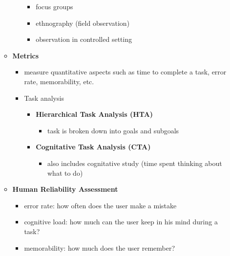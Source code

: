 \documentclass[11pt]{article}
\begin{document}
\begin{itemize}
\begin{itemize}
\begin{itemize}
\begin{itemize}
\item focus groups
\item ethnography (field observation)
\item observation in controlled setting
\end{itemize}
\end{itemize}
\item \textbf{Metrics}
\begin{itemize}
\item measure quantitative aspects such as time to complete a task, error rate, memorability, etc.
\item Task analysis
\begin{itemize}
\item \textbf{Hierarchical Task Analysis (HTA)}
\begin{itemize}
\item task is broken down into goals and subgoals
\end{itemize}
\item \textbf{Cognitative Task Analysis (CTA)}
\begin{itemize}
\item also includes cognitative study (time spent thinking about what to do)
\end{itemize}
\end{itemize}
\end{itemize}
\item \textbf{Human Reliability Assessment}
\begin{itemize}
\item error rate: how often does the user make a mistake
\item cognitive load: how much can the user keep in his mind during a task?
\item memorability: how much does the user remember?
\end{itemize}
\end{itemize}
\end{itemize}
\end{document}
